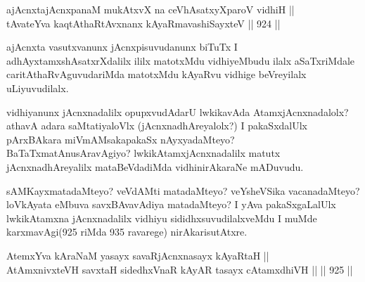 
\begin{shl}
ajAcnxtajAcnxpanaM mukAtxvX na ceVhAsatxyXparoV vidhiH || \\
tAvateYva kaqtAthaRtAvxnanx kAyaRmavashiSayxteV \hfill || 924 ||  
\end{shl}

\begin{artha}
ajAcnxta vasutxvanunx jAcnxpisuvudanunx biTuTx I adhAyxtamxshAsatxrXdalilx ililx matotxMdu vidhiyeMbudu ilalx aSaTxriMdale caritAthaRvAguvudariMda matotxMdu kAyaRvu vidhige beVreyilalx uLiyuvudilalx.
\end{artha}

\begin{artha}
vidhiyanunx jAcnxnadalilx opupxvudAdarU lwkikavAda AtamxjAcnxnadalolx? athavA adara saMtatiyaloVlx (jAcnxnadhAreyalolx?) I pakaSxdalUlx pArxBAkara miVmAMsakapakaSx nAyxyadaMteyo? BaTaTxmatAnusAravAgiyo? lwkikAtamxjAcnxnadalilx matutx jAcnxnadhAreyalilx mataBeVdadiMda vidhinirAkaraNe mADuvudu.
\end{artha}

\begin{artha}
sAMKayxmatadaMteyo? veVdAMti matadaMteyo? veYsheVSika vacanadaMteyo? loVkAyata eMbuva savxBAvavAdiya matadaMteyo? I yAva pakaSxgaLalUlx lwkikAtamxna jAcnxnadalilx vidhiyu sididhxsuvudilalxveMdu I muMde karxmavAgi(925 riMda 935 ravarege) nirAkarisutAtxre.
\end{artha}



\begin{shl}
AtemxYva kAraNaM yasayx savaRjAcnxnasayx kAyaRtaH || \\
AtAmxnivxteVH savxtaH sidedhxVnaR kAyAR tasayx cA\s \s tamxdhiVH ||  \hfill || 925 ||  
\end{shl}

